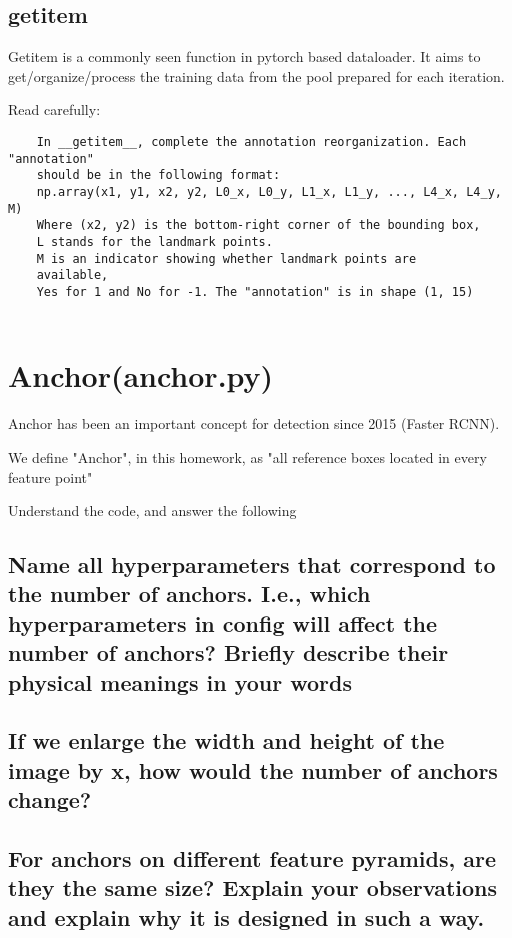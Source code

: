 \documentclass[11pt,addpoints,answers]{exam}
\begin{document}
\subsection{getitem}

Getitem is a commonly seen function in pytorch based dataloader. It aims to get/organize/process the training data from the pool prepared for each iteration.  

Read carefully:

\begin{verbatim}
    In __getitem__, complete the annotation reorganization. Each "annotation"
    should be in the following format:
    np.array(x1, y1, x2, y2, L0_x, L0_y, L1_x, L1_y, ..., L4_x, L4_y, M)
    Where (x2, y2) is the bottom-right corner of the bounding box, 
    L stands for the landmark points.
    M is an indicator showing whether landmark points are
    available, 
    Yes for 1 and No for -1. The "annotation" is in shape (1, 15)
    
\end{verbatim}


\section{Anchor(anchor.py)}
Anchor has been an important concept for detection since 2015 (Faster RCNN). 

We define "Anchor", in this homework, as "all reference boxes located in every feature point"

Understand the
code, and answer the following

\subsection{Name all hyperparameters that correspond to the number of anchors. I.e., which hyperparameters in config will affect the number of anchors?  Briefly describe their physical meanings in your words}
\begin{solution*}{}

\end{solution*}
\subsection{If we enlarge the width and height of the image by x, how would the number of anchors change?}
\begin{solution*}{}

\end{solution*}
\subsection{For anchors on different feature pyramids, are they the same size? Explain your
observations and explain why it is designed in such a way.}
\end{document}
